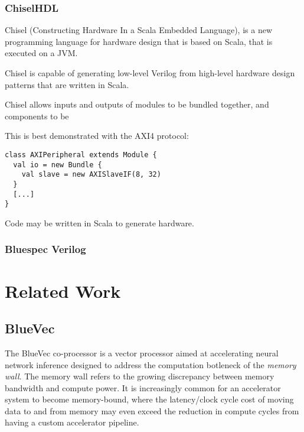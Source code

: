\documentclass[a4paper,8pt]{report}
\begin{document}
\subsection{ChiselHDL}
Chisel (Constructing Hardware In a Scala Embedded Language), is a new
programming language for hardware design that is based on Scala, that is
executed on a JVM.

Chisel is capable of generating low-level Verilog from high-level hardware
design patterns that are written in Scala.

Chisel allows inputs and outputs of modules to be bundled together, and
components to be


This is best demonstrated with the AXI4 protocol:
\tiny
\begin{verbatim}
class AXIPeripheral extends Module {
  val io = new Bundle {
    val slave = new AXISlaveIF(8, 32)
  }
  [...]
}
\end{verbatim}
\normalsize

Code may be written in Scala to generate hardware.



\subsection{Bluespec Verilog}








\chapter{Related Work} 
\section{BlueVec}
The BlueVec co-processor is a vector processor aimed at accelerating neural
network inference designed to address the computation botleneck of the
\emph{memory wall}.
The memory wall refers to the growing discrepancy between memory bandwidth and
compute power. It is increasingly common for an accelerator system to become
memory-bound, where the latency/clock cycle cost of moving data to and from
memory may even exceed the reduction in compute cycles from having a custom
accelerator pipeline.
\end{document}
